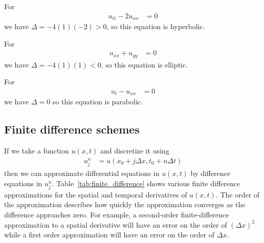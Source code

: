 \documentclass[twocolumn]{myarticle}
\begin{document}
For
\begin{align}
    u_{tt} - 2 u_{xx} &= 0
\end{align}
we have $ \Delta = - 4 (1) (-2) > 0 $, so this equation is hyperbolic.

For 
\begin{align}
    u_{xx} + u_{yy} &= 0
\end{align}
we have $ \Delta = -4 (1) (1) < 0 $, so this equation is elliptic.

For
\begin{align}
    u_t - u_{xx} &= 0
\end{align}
we have $ \Delta = 0 $ so this equation is parabolic.

\subsection{Finite difference schemes}
\label{subsec:finite_difference_schemes}

If we take a function $ u(x,t) $ and discretize it using
\begin{align}
    u^{n}_{j} &= u(x_0 + j \Delta x, t_0 + n \Delta t)
\end{align}
then we can approximate differential equations in $ u(x,t) $ by difference equations in $ u^n_j $.
Table~\ref{tab:finite_difference} shows various finite difference approximations for the spatial and temporal derivatives of $ u(x,t) $.
The order of the approximation describes how quickly the approximation converges as the difference approaches zero.
For example, a second-order finite-difference approximation to a spatial derivative will have an error on the order of $ (\Delta x)^2 $ while a first order approximation will have an error on the order of $ \Delta x $.
\end{document}
